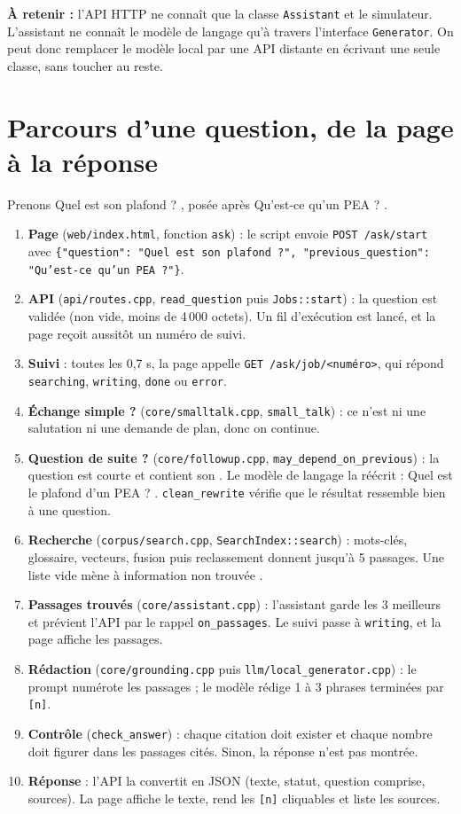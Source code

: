 \documentclass[11pt,a4paper]{article}
\newcommand{\retenir}[1]{\par\smallskip\noindent\colorbox{vigie!8}{\parbox{\dimexpr\linewidth-2\fboxsep}{\small\textbf{À retenir :} #1}}\par\smallskip}
\newcommand{\fichier}[1]{\texttt{#1}}
\begin{document}
\retenir{l'API HTTP ne connaît que la classe \texttt{Assistant} et le simulateur. L'assistant ne connaît le modèle de langage qu'à travers l'interface \texttt{Generator}. On peut donc remplacer le modèle local par une API distante en écrivant une seule classe, sans toucher au reste.}

\section{Parcours d'une question, de la page à la réponse}
\label{sec:parcours}

Prenons \og Quel est son plafond ? \fg, posée après \og Qu'est-ce qu'un PEA ? \fg.

\begin{enumerate}
  \item \textbf{Page} (\fichier{web/index.html}, fonction \texttt{ask}) : le script envoie \texttt{POST /ask/start} avec \texttt{\{"question": "Quel est son plafond ?", "previous\_question": "Qu'est-ce qu'un PEA ?"\}}.
  \item \textbf{API} (\fichier{api/routes.cpp}, \texttt{read\_question} puis \texttt{Jobs::start}) : la question est validée (non vide, moins de 4\,000 octets). Un fil d'exécution est lancé, et la page reçoit aussitôt un numéro de suivi.
  \item \textbf{Suivi} : toutes les 0,7 s, la page appelle \texttt{GET /ask/job/<numéro>}, qui répond \texttt{searching}, \texttt{writing}, \texttt{done} ou \texttt{error}.
  \item \textbf{Échange simple ?} (\fichier{core/smalltalk.cpp}, \texttt{small\_talk}) : ce n'est ni une salutation ni une demande de plan, donc on continue.
  \item \textbf{Question de suite ?} (\fichier{core/followup.cpp}, \texttt{may\_depend\_on\_previous}) : la question est courte et contient \og son \fg. Le modèle de langage la réécrit : \og Quel est le plafond d'un PEA ? \fg. \texttt{clean\_rewrite} vérifie que le résultat ressemble bien à une question.
  \item \textbf{Recherche} (\fichier{corpus/search.cpp}, \texttt{SearchIndex::search}) : mots-clés, glossaire, vecteurs, fusion puis reclassement donnent jusqu'à 5 passages. Une liste vide mène à \og information non trouvée \fg.
  \item \textbf{Passages trouvés} (\fichier{core/assistant.cpp}) : l'assistant garde les 3 meilleurs et prévient l'API par le rappel \texttt{on\_passages}. Le suivi passe à \texttt{writing}, et la page affiche les passages.
  \item \textbf{Rédaction} (\fichier{core/grounding.cpp} puis \fichier{llm/local\_generator.cpp}) : le prompt numérote les passages ; le modèle rédige 1 à 3 phrases terminées par \texttt{[n]}.
  \item \textbf{Contrôle} (\texttt{check\_answer}) : chaque citation doit exister et chaque nombre doit figurer dans les passages cités. Sinon, la réponse n'est pas montrée.
  \item \textbf{Réponse} : l'API la convertit en JSON (texte, statut, question comprise, sources). La page affiche le texte, rend les \texttt{[n]} cliquables et liste les sources.
\end{enumerate}
\end{document}
